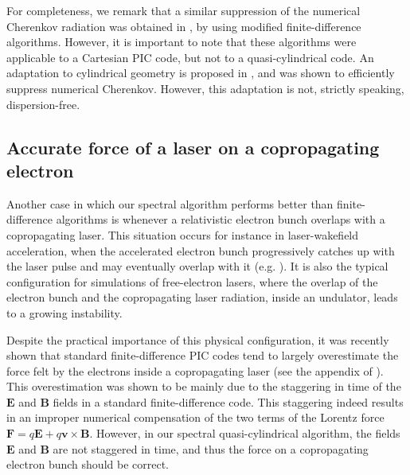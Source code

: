 \documentclass[1p,times,authoryear]{elsarticle}
\renewcommand{\vec}[1]{\boldsymbol{#1}}
\begin{document}
For completeness, we remark that a similar suppression of the
numerical Cherenkov radiation was 
obtained in \citep{LehePRSTAB2013,CowanPRSTAB2013}, by using 
modified finite-difference algorithms. However, it is important to
note that these algorithms were applicable to a Cartesian PIC code,
but not to a quasi-cylindrical code. An adaptation to
cylindrical geometry is proposed in \citep{LeheThesis}, and was 
shown to efficiently suppress numerical Cherenkov. However, this
adaptation is not, strictly speaking, dispersion-free. 

\subsection{Accurate force of a laser on a copropagating electron}
\label{sec:accurate-laser}

Another case in which our spectral algorithm performs better than
finite-difference algorithms is whenever a relativistic electron bunch
overlaps with a copropagating laser. This situation occurs for
instance in laser-wakefield acceleration, when the accelerated electron bunch
progressively catches up with the laser pulse and may eventually
overlap with it (e.g. \citep{CipicciaNatPhys2011,NemethPRL2008}). It is also the typical
configuration for simulations of free-electron lasers, where the
overlap of the electron bunch and the copropagating laser radiation, inside an
undulator, leads to a growing instability.

Despite the practical importance of this physical configuration, it
was recently shown that standard finite-difference PIC codes tend 
to largely overestimate the force felt by the electrons inside a
copropagating laser (see the appendix of \citep{LehePRSTAB2014}). This
overestimation was shown to be mainly due to the staggering in time 
of the $\vec{E}$ and $\vec{B}$ fields in a standard finite-difference
code. This staggering indeed results in an improper numerical compensation of 
the two terms of the Lorentz force $\vec{F} = q\vec{E} +
q\vec{v}\times\vec{B}$. However, in our spectral quasi-cylindrical
algorithm, the fields $\vec{E}$ and $\vec{B}$ are not staggered in
time, and thus the force on a copropagating electron bunch should be
correct.
\end{document}
